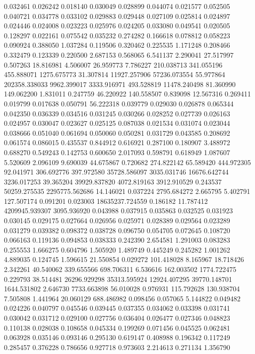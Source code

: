0.032461
0.026242
0.018140
0.030049
0.028899
0.044074
0.021577
0.052505
0.040721
0.034778
0.033102
0.029883
0.029448
0.027109
0.025814
0.024897
0.024446
0.024008
0.023223
0.025976
0.024205
0.033080
0.049541
0.020505
0.128297
0.022161
0.075542
0.035232
0.274282
0.166618
0.078812
0.058223
0.090924
0.388050
1.037284
0.119506
0.320462
0.225535
1.171248
0.208466
0.332479
0.123339
0.220500
2.687153
0.568065
6.541137
2.290041
27.517997
0.507263
18.816981
4.506007
26.959773
7.786227
210.038713
341.055196
455.888071
1275.675773
31.307814
11927.257906
57236.073554
55.977864
202358.338033
9962.399017
3333.916971
493.528819
11478.240498
81.360990
149.062200
1.831011
0.247759
46.220922
140.558507
0.839098
12.567316
0.269411
0.019799
0.017638
0.050791
56.222318
0.039779
0.029030
0.026878
0.065344
0.042350
0.036339
0.034516
0.031245
0.030266
0.028252
0.027739
0.026163
0.024957
0.030047
0.023627
0.025125
0.087038
0.021534
0.031074
0.023044
0.038666
0.051040
0.061694
0.050060
0.050281
0.031729
0.043585
0.208692
0.061574
0.086015
0.435537
0.844912
0.616921
0.287100
0.180907
3.488972
0.688270
0.549243
0.142753
0.600650
2.017093
0.598791
0.618949
1.087607
5.520609
2.096109
9.690039
44.675867
0.720682
274.822142
65.589420
444.972305
92.041971
306.692776
397.972580
35728.586097
3035.031746
16676.642744
3236.017253
39.365204
39929.837820
4072.819163
3912.910529
0.243537
50259.275535
2295775.562686
14.146021
0.037224
2795.684272
2.665795
5.402791
127.507174
0.091201
0.023003
18635237.724559
0.186182
11.787412
4209945.939307
3095.936920
0.043988
0.037915
0.035863
0.032525
0.031923
0.030145
0.029175
0.027664
0.026956
0.025971
0.028389
0.029564
0.023289
0.031279
0.039382
0.098372
0.038728
0.096750
0.054705
0.072645
0.108720
0.066163
0.119136
0.094853
0.038333
0.242390
2.654581
1.291003
0.083283
0.255553
1.666275
0.604796
1.505920
1.489749
0.445249
0.245282
1.001262
4.889035
0.124745
1.596615
21.550854
0.029272
101.418028
8.165967
18.718426
2.342261
40.540062
339.655566
698.706311
6.536616
162.003502
1774.722475
0.229793
38.514481
26296.929298
35313.595924
12924.407295
39770.148701
1644.531802
2.646730
7733.663898
56.010028
0.976931
115.792628
130.938704
7.505808
1.441964
20.060129
688.486982
0.098456
0.057065
5.144822
0.049482
0.024226
0.040797
0.045546
0.039445
0.037355
0.034062
0.033398
0.031741
0.030042
0.031712
0.029100
0.027756
0.036404
0.026477
0.027346
0.048823
0.110138
0.028038
0.108658
0.045334
0.199269
0.071456
0.045525
0.062481
0.063928
0.035146
0.093146
0.295130
0.619147
0.408988
0.196342
0.117249
0.285457
0.376228
0.786656
0.927718
0.973603
2.214613
0.271134
1.356790
